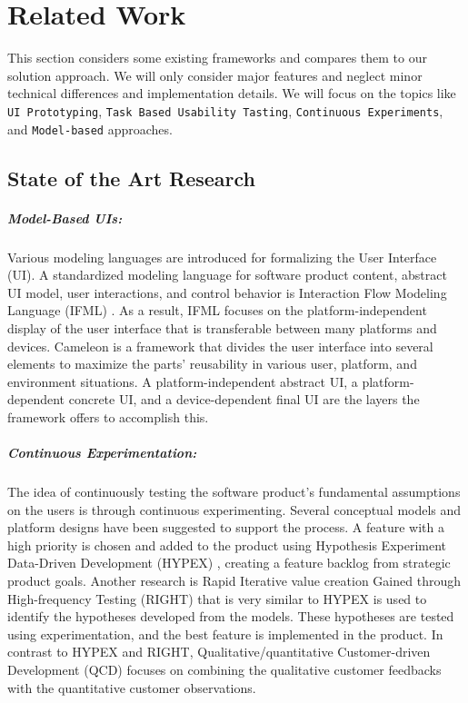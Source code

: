 \chapter{Related Work} \label{chap:csr}

This section considers some existing frameworks and compares them to our solution approach. 
We will only consider major features and neglect minor technical differences and implementation details. 
We will focus on the topics like \texttt{UI Prototyping}, \texttt{Task Based Usability Tasting}, \texttt{Continuous Experiments}, and \texttt{Model-based} approaches. 

\section{State of the Art Research}

\paragraph{Model-Based UIs:}
Various modeling languages are introduced for formalizing the User Interface (UI).
A standardized modeling language for software product content, abstract UI model, user interactions, and control behavior is Interaction Flow Modeling Language (IFML) \cite{article:ifml:piero}. 
As a result, IFML focuses on the platform-independent display of the user interface that is transferable between many platforms and devices.
Cameleon \cite{article:cameleon:balme} is a framework that divides the user interface into several elements to maximize the parts' reusability in various user, platform, and environment situations.
A platform-independent abstract UI, a platform-dependent concrete UI, and a device-dependent final UI are the layers the framework offers to accomplish this.

\paragraph{Continuous Experimentation:}
The idea of continuously testing the software product's fundamental assumptions on the users is through continuous experimenting.
Several conceptual models and platform designs have been suggested to support the process.
A feature with a high priority is chosen and added to the product using Hypothesis Experiment Data-Driven Development (HYPEX) \cite{article:hypex:model}, creating a feature backlog from strategic product goals.
Another research is Rapid Iterative value creation Gained through High-frequency Testing (RIGHT) \cite{article:right:model} that is very similar to HYPEX is used to identify the hypotheses developed from the models.
These hypotheses are tested using experimentation, and the best feature is implemented in the product.
In contrast to HYPEX and RIGHT, Qualitative/quantitative Customer-driven Development (QCD) \cite{article:qq:helena} focuses on combining the qualitative customer feedbacks with the quantitative customer observations.  

